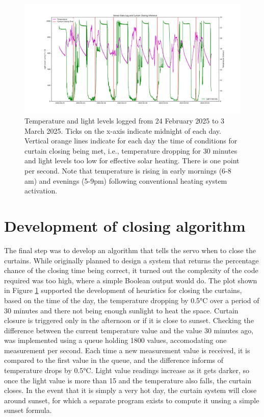 \documentclass[a4paper,12pt]{article}
\begin{document}
\begin{figure}[h!]
    \includegraphics[width=\linewidth]{./figures/logDataPlot.pdf}
    \caption{Temperature and light levels logged from 24 February 2025 to 3 March 2025. Ticks on the x-axis indicate midnight of each day.
    Vertical orange lines indicate for each day the time of conditions for 
    curtain closing being met, i.e., temperature dropping for 30 minutes and light levels too low for effective solar heating. There is one point per second. 
    Note that temperature is rising in early mornings (6-8 am) and evenings (5-9pm) following conventional heating system activation. }  
    \label{fig:plot1}
  \end{figure}

\section{Development of closing algorithm}


The final step was to develop an algorithm that tells the servo when to close the curtains. 
While originally planned to design a system that returns the percentage chance of the closing time being correct,
it turned out the complexity of the code required was too high, where a simple Boolean output would do. 
The plot shown in Figure \ref{fig:plot1} supported the development of heuristics for closing the curtains, based on the time of the day, 
the temperature dropping by 0.5°C over a period of 30 minutes and there not being enough sunlight to heat the space.
Curtain closure is triggered only in the afternoon or if it is close to sunset. 
Checking the difference between the current temperature value and the value 30 minutes ago, was implemented using a queue holding 1800 values, 
accomodating one measurement per second. Each time a new measurement value is received, it is compared to the first value in the queue, 
and the difference informs of temperature drops by 0.5°C.
Light value readings increase as it gets darker, so once the light value is more than 15 and the temperature also falls, the curtain closes.
In the event that it is simply a very hot day, the curtain system will close around sunset, for which a separate program exists to compute it
unsing a simple sunset formula\cite{url:sunsetEquation}.
\end{document}
